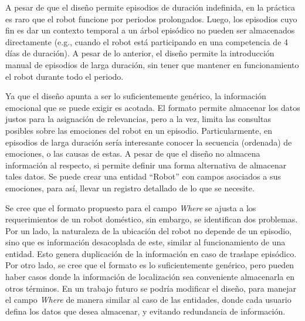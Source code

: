 A pesar de que el diseño permite episodios de duración indefinida, en la práctica es raro que el robot funcione por periodos prolongados. Luego, los episodios cuyo fin es dar un contexto temporal a un árbol episódico no pueden ser almacenados directamente (e.g., cuando el robot está participando en una competencia de 4 días de duración). A pesar de lo anterior, el diseño permite la introducción manual de episodios de larga duración, sin tener que mantener en funcionamiento el robot durante todo el periodo.

Ya que el diseño apunta a ser lo suficientemente genérico, la información emocional que se puede exigir es acotada. El formato permite almacenar los datos justos para la asignación de relevancias, pero a la vez, limita las consultas posibles sobre las emociones del robot en un episodio. Particularmente, en episodios de larga duración sería interesante conocer la secuencia (ordenada) de emociones, o las causas de estas. A pesar de que el diseño no almacena información al respecto, si permite definir una forma alternativa de almacenar tales datos. Se puede crear una entidad ``Robot'' con campos asociados a sus emociones, para así, llevar un registro detallado de lo que se necesite.

Se cree que el formato propuesto para el campo \textit{Where} se ajusta a los requerimientos de un robot doméstico, sin embargo, se identifican dos problemas. Por un lado, la naturaleza de la ubicación del robot no depende de un episodio, sino que es información desacoplada de este, similar al funcionamiento de una entidad. Esto genera duplicación de la información en caso de traslape episódico. Por otro lado, se cree que el formato es lo suficientemente genérico, pero pueden haber casos donde la información de localización sea conveniente almacenarla en otros términos. En un trabajo futuro se podría modificar el diseño, para manejar el campo \textit{Where}  de manera similar al caso de las entidades, donde cada usuario defina los datos que desea almacenar, y evitando redundancia de información.



